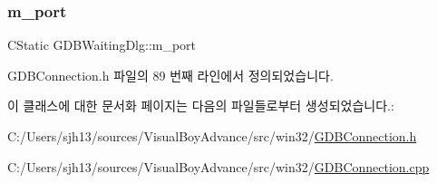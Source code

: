 \subsubsection{\texorpdfstring{m\+\_\+port}{m\_port}}
{\footnotesize\ttfamily C\+Static G\+D\+B\+Waiting\+Dlg\+::m\+\_\+port}



G\+D\+B\+Connection.\+h 파일의 89 번째 라인에서 정의되었습니다.



이 클래스에 대한 문서화 페이지는 다음의 파일들로부터 생성되었습니다.\+:\begin{DoxyCompactItemize}
\item 
C\+:/\+Users/sjh13/sources/\+Visual\+Boy\+Advance/src/win32/\mbox{\hyperlink{_g_d_b_connection_8h}{G\+D\+B\+Connection.\+h}}\item 
C\+:/\+Users/sjh13/sources/\+Visual\+Boy\+Advance/src/win32/\mbox{\hyperlink{_g_d_b_connection_8cpp}{G\+D\+B\+Connection.\+cpp}}\end{DoxyCompactItemize}
